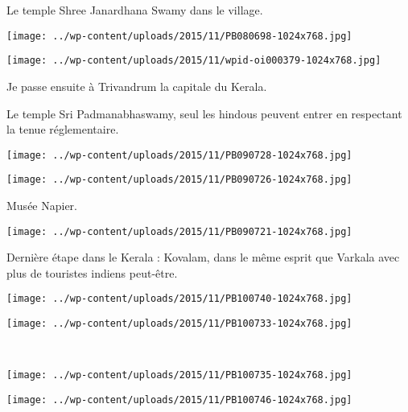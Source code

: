  Le temple Shree Janardhana Swamy dans le village. 
\begin{center} \texttt{[image: ../wp-content/uploads/2015/11/PB080698-1024x768.jpg]} \end{center}
\begin{center} \texttt{[image: ../wp-content/uploads/2015/11/wpid-oi000379-1024x768.jpg]} \end{center}

 Je passe ensuite à Trivandrum la capitale du Kerala. 

 Le temple Sri Padmanabhaswamy, seul les hindous peuvent entrer en respectant la tenue réglementaire. 
\begin{center} \texttt{[image: ../wp-content/uploads/2015/11/PB090728-1024x768.jpg]} \end{center}
\begin{center} \texttt{[image: ../wp-content/uploads/2015/11/PB090726-1024x768.jpg]} \end{center}

 Musée Napier. 
\begin{center} \texttt{[image: ../wp-content/uploads/2015/11/PB090721-1024x768.jpg]} \end{center}
\vspace{-\topsep}
\pagebreak
 
 Dernière étape dans le Kerala : Kovalam, dans le même esprit que Varkala avec plus de touristes indiens peut-être. 
\begin{center} \texttt{[image: ../wp-content/uploads/2015/11/PB100740-1024x768.jpg]} \end{center}
\begin{center} \texttt{[image: ../wp-content/uploads/2015/11/PB100733-1024x768.jpg]} \end{center}
\vspace{-\topsep}
\vspace{-3.25mm}
\pagebreak

~\\
\vspace{0.75mm}
\begin{center} \texttt{[image: ../wp-content/uploads/2015/11/PB100735-1024x768.jpg]} \end{center}
\begin{center} \texttt{[image: ../wp-content/uploads/2015/11/PB100746-1024x768.jpg]} \end{center}
\vspace{-\topsep}
\vspace{-3.25mm}
\pagebreak


